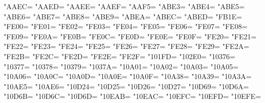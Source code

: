 \XeTeXcharclass"AAEC=\KclassCM
\XeTeXcharclass"AAED=\KclassCM
\XeTeXcharclass"AAEE=\KclassCM
\XeTeXcharclass"AAEF=\KclassCM
\XeTeXcharclass"AAF5=\KclassCM
\XeTeXcharclass"ABE3=\KclassCM
\XeTeXcharclass"ABE4=\KclassCM
\XeTeXcharclass"ABE5=\KclassCM
\XeTeXcharclass"ABE6=\KclassCM
\XeTeXcharclass"ABE7=\KclassCM
\XeTeXcharclass"ABE8=\KclassCM
\XeTeXcharclass"ABE9=\KclassCM
\XeTeXcharclass"ABEA=\KclassCM
\XeTeXcharclass"ABEC=\KclassCM
\XeTeXcharclass"ABED=\KclassCM
\XeTeXcharclass"FB1E=\KclassCM
\XeTeXcharclass"FE00=\KclassCM
\XeTeXcharclass"FE01=\KclassCM
\XeTeXcharclass"FE02=\KclassCM
\XeTeXcharclass"FE03=\KclassCM
\XeTeXcharclass"FE04=\KclassCM
\XeTeXcharclass"FE05=\KclassCM
\XeTeXcharclass"FE06=\KclassCM
\XeTeXcharclass"FE07=\KclassCM
\XeTeXcharclass"FE08=\KclassCM
\XeTeXcharclass"FE09=\KclassCM
\XeTeXcharclass"FE0A=\KclassCM
\XeTeXcharclass"FE0B=\KclassCM
\XeTeXcharclass"FE0C=\KclassCM
\XeTeXcharclass"FE0D=\KclassCM
\XeTeXcharclass"FE0E=\KclassCM
\XeTeXcharclass"FE0F=\KclassCM
\XeTeXcharclass"FE20=\KclassCM
\XeTeXcharclass"FE21=\KclassCM
\XeTeXcharclass"FE22=\KclassCM
\XeTeXcharclass"FE23=\KclassCM
\XeTeXcharclass"FE24=\KclassCM
\XeTeXcharclass"FE25=\KclassCM
\XeTeXcharclass"FE26=\KclassCM
\XeTeXcharclass"FE27=\KclassCM
\XeTeXcharclass"FE28=\KclassCM
\XeTeXcharclass"FE29=\KclassCM
\XeTeXcharclass"FE2A=\KclassCM
\XeTeXcharclass"FE2B=\KclassCM
\XeTeXcharclass"FE2C=\KclassCM
\XeTeXcharclass"FE2D=\KclassCM
\XeTeXcharclass"FE2E=\KclassCM
\XeTeXcharclass"FE2F=\KclassCM
\XeTeXcharclass"101FD=\KclassCM
\XeTeXcharclass"102E0=\KclassCM
\XeTeXcharclass"10376=\KclassCM
\XeTeXcharclass"10377=\KclassCM
\XeTeXcharclass"10378=\KclassCM
\XeTeXcharclass"10379=\KclassCM
\XeTeXcharclass"1037A=\KclassCM
\XeTeXcharclass"10A01=\KclassCM
\XeTeXcharclass"10A02=\KclassCM
\XeTeXcharclass"10A03=\KclassCM
\XeTeXcharclass"10A05=\KclassCM
\XeTeXcharclass"10A06=\KclassCM
\XeTeXcharclass"10A0C=\KclassCM
\XeTeXcharclass"10A0D=\KclassCM
\XeTeXcharclass"10A0E=\KclassCM
\XeTeXcharclass"10A0F=\KclassCM
\XeTeXcharclass"10A38=\KclassCM
\XeTeXcharclass"10A39=\KclassCM
\XeTeXcharclass"10A3A=\KclassCM
\XeTeXcharclass"10AE5=\KclassCM
\XeTeXcharclass"10AE6=\KclassCM
\XeTeXcharclass"10D24=\KclassCM
\XeTeXcharclass"10D25=\KclassCM
\XeTeXcharclass"10D26=\KclassCM
\XeTeXcharclass"10D27=\KclassCM
\XeTeXcharclass"10D69=\KclassCM
\XeTeXcharclass"10D6A=\KclassCM
\XeTeXcharclass"10D6B=\KclassCM
\XeTeXcharclass"10D6C=\KclassCM
\XeTeXcharclass"10D6D=\KclassCM
\XeTeXcharclass"10EAB=\KclassCM
\XeTeXcharclass"10EAC=\KclassCM
\XeTeXcharclass"10EFC=\KclassCM
\XeTeXcharclass"10EFD=\KclassCM
\XeTeXcharclass"10EFE=\KclassCM
